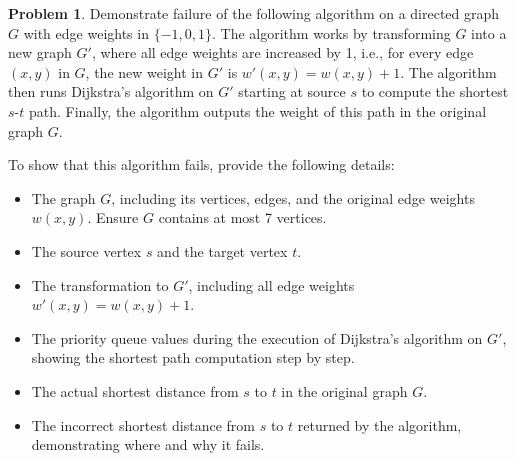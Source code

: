 \documentclass{article}
\theoremstyle{definition}
\newtheorem{problem}{Problem}
\begin{document}
\newpage


\begin{problem}
Demonstrate failure of the following algorithm on a directed graph \( G \) with edge weights in \( \{-1, 0, 1\} \). The algorithm works by transforming \( G \) into a new graph \( G' \), where all edge weights are increased by 1, i.e., for every edge \( (x, y) \) in \( G \), the new weight in \( G' \) is \( w'(x, y) = w(x, y) + 1 \). The algorithm then runs Dijkstra’s algorithm on \( G' \) starting at source \( s \) to compute the shortest \( s \)-\( t \) path. Finally, the algorithm outputs the weight of this path in the original graph \( G \).

To show that this algorithm fails, provide the following details:

\begin{itemize}
    \item The graph \( G \), including its vertices, edges, and the original edge weights \( w(x, y) \). Ensure \( G \) contains at most 7 vertices.
    \item The source vertex \( s \) and the target vertex \( t \).
    \item The transformation to \( G' \), including all edge weights \( w'(x, y) = w(x, y) + 1 \).
    \item The priority queue values during the execution of Dijkstra’s algorithm on \( G' \), showing the shortest path computation step by step.
    \item The actual shortest distance from \( s \) to \( t \) in the original graph \( G \).
    \item The incorrect shortest distance from \( s \) to \( t \) returned by the algorithm, demonstrating where and why it fails.
\end{itemize}



\end{problem}
\end{document}
